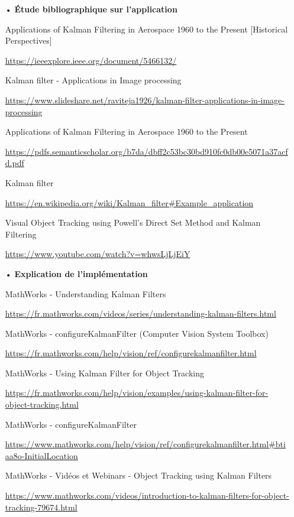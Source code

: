 \begin{itemize}
\item[•] \textbf{Étude bibliographique sur l'application}
\item[] Applications of Kalman Filtering in Aerospace 1960 to the Present [Historical Perspectives]
\item[] \url{https://ieeexplore.ieee.org/document/5466132/}
\item[] Kalman filter - Applications in Image processing
\item[] \url{https://www.slideshare.net/raviteja1926/kalman-filter-applications-in-image-processing}
\item[] Applications of Kalman Filtering in Aerospace 1960 to the Present
\item[] \url{https://pdfs.semanticscholar.org/b7da/dbff2c53bc30bd910fc0db00e5071a37acfd.pdf}
\item[] Kalman filter
\item[] \url{https://en.wikipedia.org/wiki/Kalman_filter#Example_application}
\item[] Visual Object Tracking using Powell's Direct Set Method and Kalman Filtering
\item[] \url{https://www.youtube.com/watch?v=whwsLjLjEiY}
\item[]
\item[•] \textbf{Explication de l'implémentation}
\item[] MathWorks - Understanding Kalman Filters
\item[] \url{https://fr.mathworks.com/videos/series/understanding-kalman-filters.html}
\item[] MathWorks - configureKalmanFilter (Computer Vision System Toolbox)
\item[] \url{https://fr.mathworks.com/help/vision/ref/configurekalmanfilter.html}
\item[] MathWorks - Using Kalman Filter for Object Tracking
\item[] \url{https://fr.mathworks.com/help/vision/examples/using-kalman-filter-for-object-tracking.html}
\item[] MathWorks - configureKalmanFilter
\item[] \url{https://www.mathworks.com/help/vision/ref/configurekalmanfilter.html#btiaa8o-InitialLocation }
\item[] MathWorks - Vidéos et Webinars - Object Tracking using Kalman Filters
\item[] \url{https://www.mathworks.com/videos/introduction-to-kalman-filters-for-object-tracking-79674.html }

\end{itemize}

